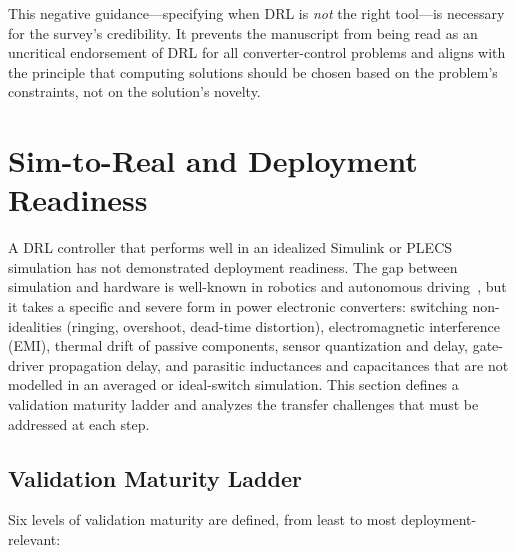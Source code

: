 \documentclass[manuscript,screen,review]{acmart}
\begin{document}
This negative guidance---specifying when DRL is \emph{not} the right tool---is necessary for the survey's credibility.
It prevents the manuscript from being read as an uncritical endorsement of DRL for all converter-control problems and aligns with the principle that computing solutions should be chosen based on the problem's constraints, not on the solution's novelty.

\section{Sim-to-Real and Deployment Readiness}
\label{sec:sim-to-real}

A DRL controller that performs well in an idealized Simulink or PLECS simulation has not demonstrated deployment readiness.
The gap between simulation and hardware is well-known in robotics and autonomous driving~\cite{zhao2020sim}, but it takes a specific and severe form in power electronic converters: switching non-idealities (ringing, overshoot, dead-time distortion), electromagnetic interference (EMI), thermal drift of passive components, sensor quantization and delay, gate-driver propagation delay, and parasitic inductances and capacitances that are not modelled in an averaged or ideal-switch simulation.
This section defines a validation maturity ladder and analyzes the transfer challenges that must be addressed at each step.

\subsection{Validation Maturity Ladder}

Six levels of validation maturity are defined, from least to most deployment-relevant:
\end{document}
